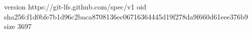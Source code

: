version https://git-lfs.github.com/spec/v1
oid sha256:f1d0bfe7b1d96c2baca8708136ec06716364445d19f278da9f660d61eee376b9
size 3697
